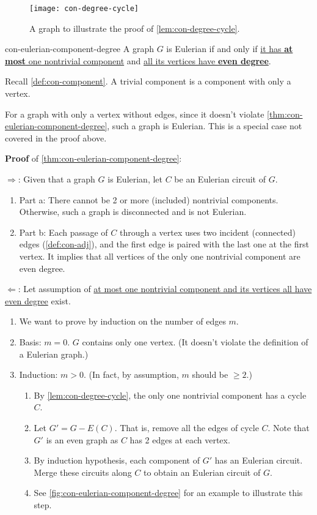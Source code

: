\documentclass[../src/handouts/main.tex]{subfiles}
\begin{document}
\begin{figure}[htbp]
  \centering
  \texttt{[image: con-degree-cycle]}
  \caption{A graph to illustrate the proof of \cref{lem:con-degree-cycle}.}
  \label{fig:con-degree-cycle}
\end{figure}

\begin{theorem}{}{con-eulerian-component-degree}
  A graph $G$ is Eulerian if and only if \ul{it has \textbf{at most} one nontrivial component} and \ul{all its vertices have \textbf{even degree}}.
\end{theorem}

Recall \cref{def:con-component}. A trivial component is a component with only a vertex.

For a graph with only a vertex without edges, since it doesn't violate \cref{thm:con-eulerian-component-degree}, such a graph is Eulerian. This is a special case not covered in the proof above.

\textbf{Proof} of \cref{thm:con-eulerian-component-degree}:

$\Rightarrow$: Given that a graph $G$ is Eulerian, let $C$ be an Eulerian circuit of $G$.
\begin{enumerate}
  \item Part a: There cannot be 2 or more (included) nontrivial components. Otherwise, such a graph is disconnected and is not Eulerian.
  \item Part b: Each passage of $C$ through a vertex uses two incident (connected) edges (\cref{def:con-adj}), and the first edge is paired with the last one at the first vertex. It implies that all vertices of the only one nontrivial component are even degree.
\end{enumerate}

$\Leftarrow$: Let assumption of \underline{at most one nontrivial component and its vertices all have even degree} exist.
\begin{enumerate}
  \item We want to prove by induction on the number of edges $m$.
  \item Basis: $m = 0$. $G$ contains only one vertex. (It doesn't violate the definition of a Eulerian graph.)
  \item Induction: $m>0$. (In fact, by assumption, $m$ should be $\geq 2$.)
    \begin{enumerate}
      \item By \cref{lem:con-degree-cycle}, the only one nontrivial component has a cycle $C$.
      \item Let $G' = G - E(C)$. That is, remove all the edges of cycle $C$. Note that $G'$ is an even graph as $C$ has 2 edges at each vertex.
      \item By induction hypothesis, each component of $G'$ has an Eulerian circuit. Merge these circuits along $C$ to obtain an Eulerian circuit of $G$.
      \item See \cref{fig:con-eulerian-component-degree} for an example to illustrate this step.
    \end{enumerate}
\end{enumerate}
\end{document}
